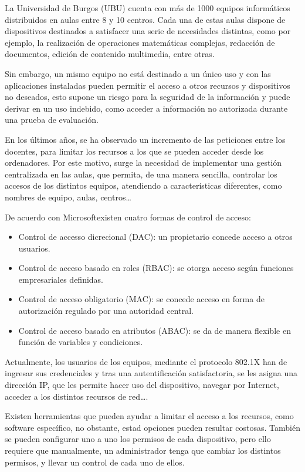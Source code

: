 
La Universidad de Burgos (UBU) cuenta con más de 1000 equipos informáticos distribuidos en aulas entre 8 y 10 centros.
Cada una de estas aulas dispone de dispositivos destinados a satisfacer una serie de necesidades distintas, como por ejemplo,
la realización de operaciones matemáticas complejas, redacción de documentos, edición de contenido multimedia, entre otras.

Sin embargo, un mismo equipo no está destinado a un único uso y con las aplicaciones instaladas pueden permitir el acceso a otros
recursos y dispositivos no deseados, esto supone un riesgo para la seguridad de la información y puede derivar en un uso
indebido, como acceder a información no autorizada durante una prueba de evaluación.

En los últimos años, se ha observado un incremento de las peticiones entre los docentes, para limitar los recursos a
los que se pueden acceder desde los ordenadores.
Por este motivo, surge la necesidad de implementar una gestión centralizada en las aulas, que permita, de una manera sencilla, controlar
los accesos de los distintos equipos, atendiendo a características diferentes, como nombres de equipo, aulas, centros\ldots

De acuerdo con Microsoft\cite{microsoftQuAccess}existen cuatro formas de control de acceso:
    \begin{itemize}
        \item Control de accesso dicrecional (DAC): un propietario concede acceso a otros usuarios.
        \item Control de acceso basado en roles (RBAC): se otorga acceso según funciones empresariales definidas.
        \item Control de acceso obligatorio (MAC): se concede acceso en forma de autorización regulado por una autoridad central.
        \item Control de acceso basado en atributos (ABAC): se da de manera flexible en función de variables y condiciones.
    \end{itemize}

Actualmente, los usuarios de los equipos, mediante el protocolo 802.1X\cite{eswiki:802.1X} han de ingresar sus credenciales
y tras una autentificación satisfactoria, se les asigna una dirección IP, que les permite hacer uso del dispositivo, navegar
por Internet, acceder a los distintos recursos de red\ldots.

Existen herramientas que pueden ayudar a limitar el acceso a los recursos, como software específico, no obstante,
estad opciones pueden resultar costosas.
También se pueden configurar uno a uno los permisos de cada dispositivo, pero ello requiere
que manualmente, un administrador tenga que cambiar los distintos permisos, y llevar un control de cada uno de ellos.

